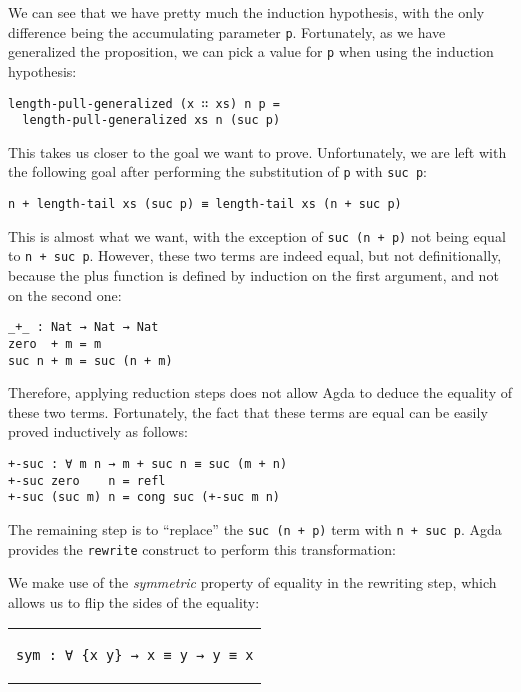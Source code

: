 \documentclass[runningheads]{llncs}
\begin{document}
We can see that we have pretty much the induction hypothesis, with the only difference
being the accumulating parameter \lstinline{p}. Fortunately, as we have generalized the
proposition, we can pick a value for \lstinline{p} when using the induction
hypothesis:

\begin{lstlisting}
length-pull-generalized (x ∷ xs) n p =
  length-pull-generalized xs n (suc p)
\end{lstlisting}

This takes us closer to the goal we want to prove. Unfortunately, we are left with the
following goal after performing the substitution of \lstinline{p} with \lstinline{suc p}:

\begin{lstlisting}
n + length-tail xs (suc p) ≡ length-tail xs (n + suc p)
\end{lstlisting}

This is almost what we want, with the exception of \lstinline{suc (n + p)} not being
equal to \lstinline{n + suc p}. However, these two terms are indeed equal, but not
definitionally, because the plus function is defined by induction on the first argument,
and not on the second one:

\begin{lstlisting}
_+_ : Nat → Nat → Nat
zero  + m = m
suc n + m = suc (n + m)
\end{lstlisting}

Therefore, applying reduction steps does not allow Agda to deduce the equality of these
two terms. Fortunately, the fact that these terms are equal can be easily proved
inductively as follows:

\begin{lstlisting}
+-suc : ∀ m n → m + suc n ≡ suc (m + n)
+-suc zero    n = refl
+-suc (suc m) n = cong suc (+-suc m n)
\end{lstlisting}

The remaining step is to ``replace'' the \lstinline{suc (n + p)} term with
\lstinline{n + suc p}. Agda provides the \lstinline{rewrite} construct to perform this
transformation:



We make use of the \emph{symmetric} property of equality in the rewriting step, which
allows us to flip the sides of the equality:

\begin{center}
\begin{tabular}{c}
\begin{lstlisting}
sym : ∀ {x y} → x ≡ y → y ≡ x
\end{lstlisting}
\end{tabular}
\end{center}
\end{document}
